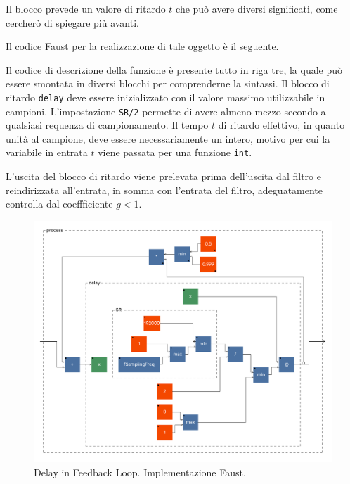 \begin{refsection}
Il blocco prevede un valore di ritardo $t$ che può avere diversi significati,
come cercherò di spiegare più avanti.

Il codice Faust per la realizzazione di tale oggetto è il seguente.



Il codice di descrizione della funzione è presente tutto in riga tre, la quale
può essere smontata in diversi blocchi per comprenderne la sintassi. Il blocco di
ritardo \texttt{delay} deve essere inizializzato con il valore massimo utilizzabile in
campioni. L'impostazione \texttt{SR/2} permette di avere almeno mezzo secondo
a qualsiasi requenza di campionamento. Il tempo $t$ di ritardo effettivo, in
quanto unità al campione, deve essere necessariamente un intero, motivo per cui
la variabile in entrata $t$ viene passata per una funzione \texttt{int}.

L'uscita del blocco di ritardo viene prelevata prima dell'uscita dal filtro e
reindirizzata all'entrata, in somma con l'entrata del filtro, adeguatamente
controlla dal coeffficiente $g < 1$.

\begin{figure}[t!]
  \centering
  \includegraphics[width=\textwidth]{CAPITOLI/0500/CODES/REV/dfl-svg/process.pdf}
  \caption[]{Delay in Feedback Loop. Implementazione Faust.}
  \label{faust:dfl}
\end{figure}


\end{refsection}

